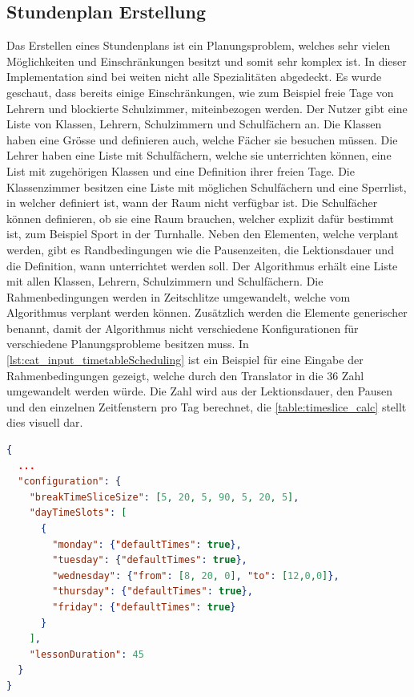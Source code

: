 \subsection{Stundenplan Erstellung}
Das Erstellen eines Stundenplans ist ein Planungsproblem, welches sehr vielen Möglichkeiten und Einschränkungen besitzt und somit sehr komplex ist. In dieser Implementation sind bei weiten 
nicht alle Spezialitäten abgedeckt. Es wurde geschaut, dass bereits einige Einschränkungen, wie zum Beispiel freie Tage von Lehrern und blockierte Schulzimmer, miteinbezogen werden. 
Der Nutzer gibt eine Liste von Klassen, Lehrern, Schulzimmern und Schulfächern an. Die Klassen haben eine Grösse und definieren auch, welche Fächer sie besuchen müssen. Die Lehrer haben 
eine Liste mit Schulfächern, welche sie unterrichten können, eine List mit zugehörigen Klassen und eine Definition ihrer freien Tage. Die Klassenzimmer besitzen eine Liste mit möglichen 
Schulfächern und eine Sperrlist, in welcher definiert ist, wann der Raum nicht verfügbar ist. Die Schulfächer können definieren, ob sie eine Raum brauchen, welcher explizit dafür 
bestimmt ist, zum Beispiel Sport in der Turnhalle. Neben den Elementen, welche verplant werden, gibt es Randbedingungen wie die Pausenzeiten, die Lektionsdauer und die Definition, 
wann unterrichtet werden soll. Der Algorithmus erhält eine Liste mit allen Klassen, Lehrern, Schulzimmern und Schulfächern. Die Rahmenbedingungen werden in Zeitschlitze umgewandelt, 
welche vom Algorithmus verplant werden können. Zusätzlich werden die Elemente generischer benannt, damit der Algorithmus nicht verschiedene Konfigurationen für verschiedene 
Planungsprobleme besitzen muss. In \autoref{lst:cat_input_timetableScheduling} ist ein Beispiel für eine Eingabe der Rahmenbedingungen gezeigt, welche durch den Translator in die 36 Zahl 
umgewandelt werden würde. Die Zahl wird aus der Lektionsdauer, den Pausen und den einzelnen Zeitfenstern pro Tag berechnet, die \autoref{table:timeslice_calc} stellt dies visuell dar.

\begin{lstlisting}[language=JSON, caption=Ausschnitt einer Eingabe für das Stundenplanproblem für die Rahmenbedingungen, label=lst:cat_input_timetableScheduling]  
{
  ...
  "configuration": {
    "breakTimeSliceSize": [5, 20, 5, 90, 5, 20, 5],
    "dayTimeSlots": [
      {
        "monday": {"defaultTimes": true},
        "tuesday": {"defaultTimes": true},
        "wednesday": {"from": [8, 20, 0], "to": [12,0,0]},
        "thursday": {"defaultTimes": true},
        "friday": {"defaultTimes": true}
      }
    ],
    "lessonDuration": 45
  }
}
\end{lstlisting}

